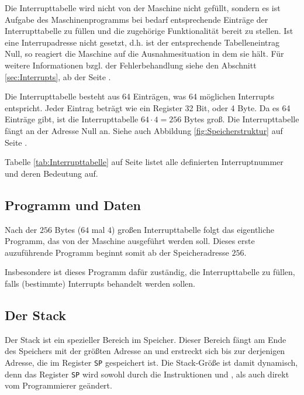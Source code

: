 Die Interrupttabelle wird nicht von der Maschine nicht gefüllt, sondern es ist
Aufgabe des Maschinenprogramms bei bedarf entsprechende Einträge der
Interrupttabelle zu füllen und die zugehörige Funktionalität bereit zu stellen.
Ist eine Interrupadresse nicht gesetzt, d.h. ist der entsprechende
Tabelleneintrag Null, so reagiert die Maschine auf die Ausnahmesituation
in dem sie hält. Für weitere Informationen bzgl. der Fehlerbehandlung siehe den
Abschnitt \ref{sec:Interrupts}, ab der Seite \pageref{sec:Interrupts}.

Die Interrupttabelle besteht aus 64 Einträgen, was 64 möglichen Interrupts
entspricht. Jeder Eintrag beträgt wie ein Register 32 Bit, oder 4 Byte. Da es
64 Einträge gibt, ist die Interrupttabelle $64 \cdot 4 = 256$ Bytes groß. Die
Interrupttabelle fängt an der Adresse Null an. Siehe auch Abbildung
\ref{fig:Speicherstruktur} auf Seite \pageref{fig:Speicherstruktur}.


Tabelle \ref{tab:Interrupttabelle} auf Seite
\pageref{tab:Interrupttabelle} listet alle definierten
Interruptnummer und deren Bedeutung auf.


\subsection{Programm und Daten}
\label{subsec:Prog-Daten}

Nach der $256$ Bytes ($64$ mal $4$) großen Interrupttabelle
folgt das eigentliche Programm, das von der Maschine ausgeführt werden soll.
Dieses erste auzuführende Programm beginnt somit ab der Speicheradresse $256$.

Insbesondere ist dieses Programm dafür zuständig, die Interrupttabelle zu
füllen, falls (bestimmte) Interrupts behandelt werden sollen.



\subsection{Der Stack}
\label{subsec:Stack}

Der Stack ist ein spezieller Bereich im Speicher. Dieser Bereich fängt am Ende
des Speichers mit der größten Adresse an und erstreckt sich bis zur derjenigen
Adresse, die im Register \texttt{SP} gespeichert ist. Die Stack-Größe ist damit
dynamisch, denn das Register \texttt{SP} wird sowohl durch die Instruktionen
 und , als auch direkt vom Programmierer geändert.

